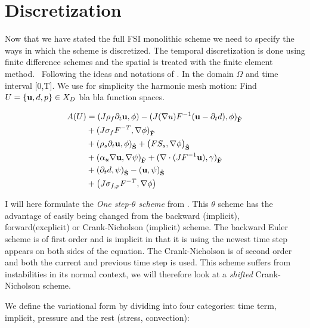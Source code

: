 \section{Discretization}
Now that we have stated the full FSI monolithic scheme we need to specify the ways in which the scheme is discretized. The temporal discretization is done using finite difference schemes and the spatial is treated with the finite element method.  \
Following the ideas and notations of \cite{Wick2011}. In the domain $\Omega$ and time interval [0,T]. We use for simplicity the harmonic mesh motion: 
Find $ U = \{\bold{u}, d, p\} \in X_D $ bla bla function spaces.

\begin{align}
A(U)&= (J \rho_f \partial_t \bold{u} , \phi ) - (J (\nabla u)F^{-1}(\bold{u} - \partial_t d) , \phi )_{\mathcal{\hat{F}}}  \\
       &+ ( J \sigma_{f} F^{-T} , \nabla \phi )_{\mathcal{\hat{F}}} \\
       &+ (\rho_s \partial_t \bold{u} , \phi)_{\mathcal{\hat{S}}}   + \big(F S_s, \nabla \phi \big)_{\mathcal{\hat{S}}} \\
       &+ ( \alpha_u \nabla \bold{u}, \nabla \psi)_{\mathcal{\hat{F}}} + (\nabla \cdot (J F^{-1} \bold{u}),\gamma )_{\mathcal{\hat{F}}} \\
       &+ (\partial_t d , \psi)_{\mathcal{\hat{S}}}  - ( \bold{u} , \psi )_{\mathcal{\hat{S}}} \\ 
       &+  \big( J \sigma_{f,p} F^{-T}, \nabla \phi  \big) 	 		
\end{align}


I will here formulate the \textit{One step-$\theta$ scheme} from \cite{Wick2011}. This $\theta$ scheme has the advantage of easily being changed from the backward (implicit), forward(excplicit) or Crank-Nicholson (implicit) scheme. The backward Euler scheme is of first order and is implicit in that it is using the newest time step appears on both sides of the equation. The Crank-Nicholson is of second order and both the current and previous time step is used. This scheme suffers from instabilities in its normal context, we will therefore look at a \textit{shifted} Crank-Nicholson scheme. 

We define the variational form by dividing into four categories: time term, implicit, pressure and the rest (stress, convection):

